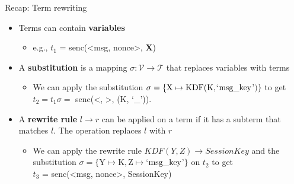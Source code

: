 \documentclass[11pt,aspectratio=169]{beamer}
\begin{document}
\begin{frame}[fragile]{Recap: Term rewriting}
    \begin{itemize}
        \item Terms can contain \textbf{variables}
        \begin{itemize}
            \item e.g., $t_1$ = senc(<msg, nonce>, \textbf{X})
        \end{itemize}
        \item A \textbf{substitution} is a mapping
              $\sigma: \mathcal{V} \rightarrow \mathcal{T}$
              that replaces variables with terms
        \begin{itemize}
            \item We can apply the substitution
                $\sigma = \{\text{X} \mapsto \text{KDF}(\text{K},$`$\text{msg}\_\text{key}$'$)\}$ 
                to get $t_2 = t_1\sigma =$
                senc(<\msg, \nonce>, \KDF(K, `\msg\_\key')).
        \end{itemize}
        \item A \textbf{rewrite rule} $l \rightarrow r$ can be applied on a 
              term if it has a subterm that matches $l$. The operation replaces 
              $l$ with $r$
        \begin{itemize}
            \item We can apply the rewrite rule
                  $KDF(Y,Z) \rightarrow \mathit{SessionKey}$
                  and the substitution
                  $\sigma = \{\text{Y} \mapsto \text{K}, \text{Z}
                  \mapsto $`$\text{msg}\_\text{key}$'$\}$ on $t_2$ to get \\
                  $t_3$ = senc(<msg, nonce>, SessionKey)
        \end{itemize}
    \end{itemize}
\end{frame}
\end{document}
